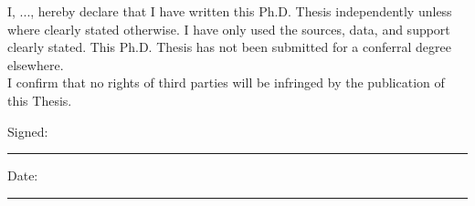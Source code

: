 I, ..., hereby declare that I have written this Ph.D. Thesis independently unless where clearly stated otherwise. I have only used the sources, data, and support clearly stated. This Ph.D. Thesis has not been submitted for a conferral degree elsewhere.
\vspace{1cm}\\
I confirm that no rights of third parties will be infringed by the publication of this Thesis.\\
\vspace{1.5cm}

Signed:\\
\rule[1em]{25em}{0.5pt} %

Date:\\
\rule[1em]{25em}{0.5pt} %

